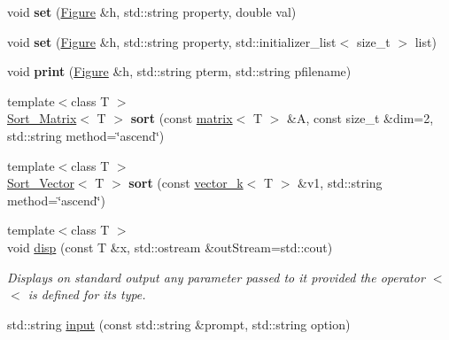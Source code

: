 \begin{DoxyCompactItemize}
\item 
\hypertarget{namespacekeycpp_afcd6ae07fc18f5374868fe314f00108c}{void {\bfseries set} (\hyperlink{classkeycpp_1_1_figure}{Figure} \&h, std\-::string property, double val)}\label{namespacekeycpp_afcd6ae07fc18f5374868fe314f00108c}

\item 
\hypertarget{namespacekeycpp_ae67eb981ff22ef79a4ee90a9a40ae21f}{void {\bfseries set} (\hyperlink{classkeycpp_1_1_figure}{Figure} \&h, std\-::string property, std\-::initializer\-\_\-list$<$ size\-\_\-t $>$ list)}\label{namespacekeycpp_ae67eb981ff22ef79a4ee90a9a40ae21f}

\item 
\hypertarget{namespacekeycpp_af9dec3da4533a1db21a6c6c4fe8e740a}{void {\bfseries print} (\hyperlink{classkeycpp_1_1_figure}{Figure} \&h, std\-::string pterm, std\-::string pfilename)}\label{namespacekeycpp_af9dec3da4533a1db21a6c6c4fe8e740a}

\item 
\hypertarget{namespacekeycpp_abe567d1c5cdf91722dfbe5da89e859e8}{{\footnotesize template$<$class T $>$ }\\\hyperlink{structkeycpp_1_1_sort___matrix}{Sort\-\_\-\-Matrix}$<$ T $>$ {\bfseries sort} (const \hyperlink{classkeycpp_1_1matrix}{matrix}$<$ T $>$ \&A, const size\-\_\-t \&dim=2, std\-::string method=\char`\"{}ascend\char`\"{})}\label{namespacekeycpp_abe567d1c5cdf91722dfbe5da89e859e8}

\item 
\hypertarget{namespacekeycpp_a0ab724c8ffc30f7beac54280a4ee81eb}{{\footnotesize template$<$class T $>$ }\\\hyperlink{structkeycpp_1_1_sort___vector}{Sort\-\_\-\-Vector}$<$ T $>$ {\bfseries sort} (const \hyperlink{classkeycpp_1_1vector__k}{vector\-\_\-k}$<$ T $>$ \&v1, std\-::string method=\char`\"{}ascend\char`\"{})}\label{namespacekeycpp_a0ab724c8ffc30f7beac54280a4ee81eb}

\item 
\hypertarget{namespacekeycpp_af4a2245da139cf6cf2e03426476b3b88}{{\footnotesize template$<$class T $>$ }\\void \hyperlink{namespacekeycpp_af4a2245da139cf6cf2e03426476b3b88}{disp} (const T \&x, std\-::ostream \&out\-Stream=std\-::cout)}\label{namespacekeycpp_af4a2245da139cf6cf2e03426476b3b88}

\begin{DoxyCompactList}\small\item\em Displays on standard output any parameter passed to it provided the operator $<$$<$ is defined for its type. \end{DoxyCompactList}\item 
\hypertarget{namespacekeycpp_aba69db64fe38ad271de1939d3f1a5520}{std\-::string \hyperlink{namespacekeycpp_aba69db64fe38ad271de1939d3f1a5520}{input} (const std\-::string \&prompt, std\-::string option)}\label{namespacekeycpp_aba69db64fe38ad271de1939d3f1a5520}


\end{DoxyCompactItemize}
